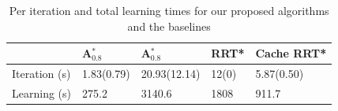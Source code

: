 \documentclass{article}  %
\begin{document}
	\begin{table}[]
	\centering

	\begin{tabular}{|l|l|l|l|l|}
	\hline
	                        & A$_{0.8}^*$     & A$_{0.8}^*$       & RRT*  & Cache RRT* \\ \hline
	Iteration (s) & 1.83(0.79) & 20.93(12.14) & 12(0) & 5.87(0.50)  \\ \hline
	Learning (s) & 275.2      & 3140.6       & 1808  & 911.7       \\ \hline
	\end{tabular}
	\caption{Per iteration and total learning times for our proposed algorithms and the baselines}
	\label{tab:time}
	\end{table}




\end{document}
